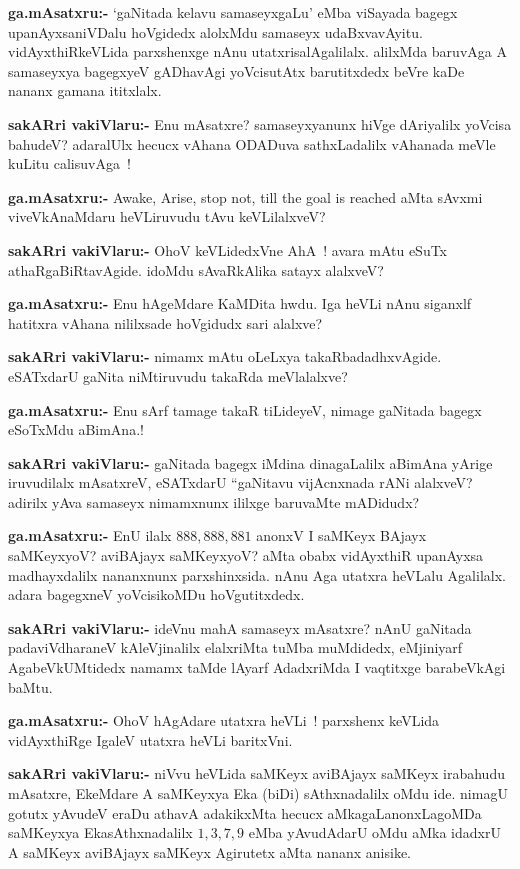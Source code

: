\smallskip
\noindent
\textbf{ga.mAsatxru:-} `gaNitada kelavu samaseyxgaLu' eMba viSayada bagegx upanAyxsaniVDalu hoVgidedx alolxMdu samaseyx udaBxvavAyitu. vidAyxthiRkeVLida parxshenxge nAnu utatxrisalAgalilalx. alilxMda baruvAga A samaseyxya bagegxyeV gADhavAgi yoVcisutAtx barutitxdedx beVre kaDe nananx gamana ititxlalx.

\smallskip
\noindent
\textbf{sakARri vakiVlaru:-} Enu mAsatxre? samaseyxyanunx hiVge dAriyalilx yoVcisa bahudeV? adaralUlx hecucx vAhana ODADuva sathxLadalilx vAhanada meVle kuLitu calisuvAga~!

\smallskip
\noindent
\textbf{ga.mAsatxru:-} {\rm Awake, Arise, stop not, till the goal is reached} aMta sAvxmi viveVkAnaMdaru heVLiruvudu tAvu keVLilalxveV?

\smallskip
\noindent
\textbf{sakARri vakiVlaru:-} OhoV keVLidedxVne AhA~! avara mAtu eSuTx athaRgaBiRtavAgide. idoMdu sAvaRkAlika satayx alalxveV?

\smallskip
\noindent
\textbf{ga.mAsatxru:-} Enu hAgeMdare KaMDita hwdu. Iga heVLi nAnu siganxlf hatitxra vAhana nililxsade hoVgidudx sari alalxve?

\smallskip
\noindent
\textbf{sakARri vakiVlaru:-} nimamx mAtu oLeLxya takaRbadadhxvAgide. eSATxdarU gaNita niMtiru\-vudu takaRda meVlalalxve?

\smallskip
\noindent
\textbf{ga.mAsatxru:-} Enu sArf tamage takaR tiLideyeV, nimage gaNitada bagegx eSoTxMdu aBimAna.!

\smallskip
\noindent
\textbf{sakARri vakiVlaru:-} gaNitada bagegx iMdina dinagaLalilx aBimAna yArige iruvudilalx mAsatxreV,  eSATxdarU ``gaNitavu vijAcnxnada rANi alalxveV? adirilx yAva samaseyx nimamxnunx ililxge baruvaMte mADidudx?

\smallskip
\noindent
\textbf{ga.mAsatxru:-} EnU ilalx $888, 888, 881$  anonxV I saMKeyx BAjayx saMKeyxyoV? aviBAjayx saMKeyxyoV? aMta obabx vidAyxthiR upanAyxsa madhayxdalilx nananxnunx parxshinxsida. nAnu Aga utatxra heVLalu Agalilalx. adara bagegxneV yoVcisikoMDu hoVgutitxdedx.

\smallskip
\noindent
\textbf{sakARri vakiVlaru:-} ideVnu mahA samaseyx mAsatxre? nAnU gaNitada padaviVdharaneV kAleVjinalilx elalxriMta tuMba muMdidedx, eMjiniyarf AgabeVkUMtidedx namamx taMde lAyarf AdadxriMda I vaqtitxge barabeVkAgi baMtu.

\smallskip
\noindent
\textbf{ga.mAsatxru:-} OhoV hAgAdare utatxra heVLi~! parxshenx keVLida vidAyxthiRge IgaleV utatxra heVLi baritxVni.

\smallskip
\noindent
\textbf{sakARri vakiVlaru:-} niVvu heVLida saMKeyx aviBAjayx saMKeyx irabahudu mAsatxre, EkeMdare A saMKeyxya Eka (biDi) sAthxnadalilx oMdu ide. nimagU gotutx yAvudeV eraDu athavA adakikxMta hecucx aMkagaLanonxLagoMDa saMKeyxya EkasAthxnadalilx $1, 3, 7, 9$ eMba yAvudAdarU oMdu aMka idadxrU A saMKeyx aviBAjayx saMKeyx Agirutetx aMta nananx anisike.

